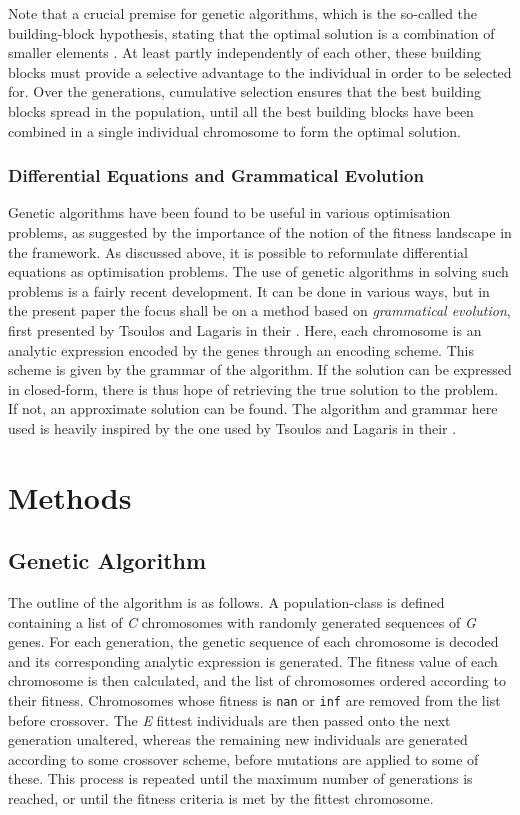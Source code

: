\documentclass[multicolumn, 12pt]{extarticle}
\begin{document}
Note that a crucial premise for genetic algorithms, which is the so-called the building-block hypothesis, stating that the optimal solution is a combination of smaller elements \cite{Eyal}. At least partly independently of each other, these building blocks must provide a selective advantage to the individual in order to be selected for. Over the generations, cumulative selection ensures that the best building blocks spread in the population, until all the best building blocks have been combined in a single individual chromosome to form the optimal solution. 


\subsubsection{Differential Equations and Grammatical Evolution}
Genetic algorithms have been found to be useful in various optimisation problems, as suggested by the importance of the notion of the fitness landscape in the framework. As discussed above, it is possible to reformulate differential equations as optimisation problems. The use of genetic algorithms in solving such problems is a fairly recent development. It can be done in various ways, but in the present paper the focus shall be on a method based on \textit{grammatical evolution}, first presented by Tsoulos and Lagaris in their  \cite{Lagaris}. Here, each chromosome is an analytic expression encoded by the genes through an encoding scheme. This scheme is given by the grammar of the algorithm. If the solution can be expressed in closed-form, there is thus hope of retrieving the true solution to the problem. If not, an approximate solution can be found. The algorithm and grammar here used is heavily inspired by the one used by Tsoulos and Lagaris in their  \cite{Lagaris}.


\section{Methods}

\subsection{Genetic Algorithm}
The outline of the algorithm is as follows. A population-class is defined containing a list of \textit{C} chromosomes with randomly generated sequences of \textit{G} genes. For each generation, the genetic sequence of each chromosome is decoded and its corresponding analytic expression is generated. The fitness value of each chromosome is then calculated, and the list of chromosomes ordered according to their fitness. Chromosomes whose fitness is \texttt{nan} or \texttt{inf} are removed from the list before crossover. The \textit{E} fittest individuals are then passed onto the next generation unaltered, whereas the remaining new individuals are generated according to some crossover scheme, before mutations are applied to some of these.  This process is repeated until the maximum number of generations is reached, or until the fitness criteria is met by the fittest chromosome.
\end{document}
